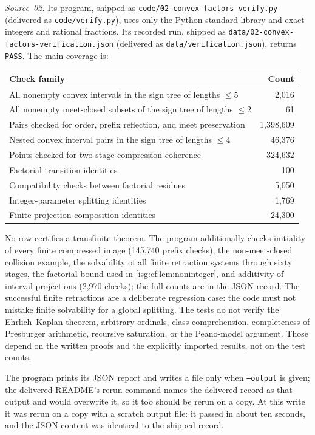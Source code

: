 \documentclass[11pt]{article}
\theoremstyle{definition}
\theoremstyle{remark}
\newcommand{\fn}[1]{\nolinkurl{#1}}
\begin{document}
\emph{Source~02.} Its program, shipped as
\fn{code/02-convex-factors-verify.py} (delivered as
\fn{code/verify.py}), uses only the Python standard library and exact
integers and rational fractions. Its recorded run, shipped as
\fn{data/02-convex-factors-verification.json} (delivered as
\fn{data/verification.json}), returns \texttt{PASS}. The main coverage
is:
\begin{center}\small
\begin{tabular}{@{}p{}r@{}}
\toprule
Check family & Count\\
\midrule
All nonempty convex intervals in the sign tree of lengths $\le5$ & 2,016\\
All nonempty meet-closed subsets of the sign tree of lengths $\le2$ & 61\\
Pairs checked for order, prefix reflection, and meet preservation & 1,398,609\\
Nested convex interval pairs in the sign tree of lengths $\le4$ & 46,376\\
Points checked for two-stage compression coherence & 324,632\\
Factorial transition identities & 100\\
Compatibility checks between factorial residues & 5,050\\
Integer-parameter splitting identities & 1,769\\
Finite projection composition identities & 24,300\\
\bottomrule
\end{tabular}
\end{center}
No row certifies a transfinite theorem. The program additionally checks
initiality of every finite compressed image (145,740 prefix checks), the
non-meet-closed collision example, the solvability of all finite
retraction systems through sixty stages, the factorial bound used in
\cref{isg:cf:lem:noninteger}, and additivity of interval projections
(2,970 checks); the full counts are in the JSON record. The successful
finite retractions are a deliberate regression case: the code must not
mistake finite solvability for a global splitting. The tests do not
verify the Ehrlich--Kaplan theorem, arbitrary ordinals, class
comprehension, completeness of Presburger arithmetic, recursive
saturation, or the Peano-model argument. Those depend on the written
proofs and the explicitly imported results, not on the test counts.

The program prints its JSON report and writes a file only when
\texttt{--output} is given; the delivered README's rerun command names the
delivered record as that output and would overwrite it, so it too should
be rerun on a copy. At this write it was rerun on a copy with a scratch
output file: it passed in about ten seconds, and the JSON content was
identical to the shipped record.
\end{document}
